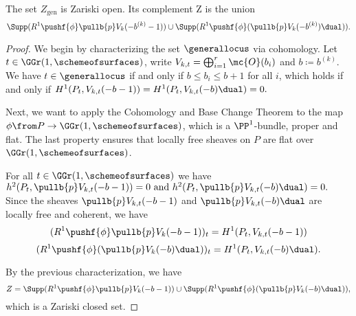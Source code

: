 \begin{proposition}
	The set $Z_{\text{gen}}$ is Zariski open. Its complement Z is the union
	\[
		\Supp(R^1 \pushf{\phi}\pullb{p} V_{k}(-b^{(k)}-1)) \cup
		\Supp(R^1 \pushf{\phi}(\pullb{p} V_{k}(-b^{(k)})\dual)).
	\]
\end{proposition}
\begin{proof}
	We begin by characterizing the set $\generallocus$ via cohomology. Let $t\in \GGr(1,\schemeofsurfaces)$, write $V_{k,t}=\bigoplus_{i=1}^r \mc{O}(b_i)$ and $b\coloneqq b^{(k)}$. We have $t\in \generallocus$ if and only if $b\leq b_i \leq b+1$ for all $i$, which holds if and only if
	$
	H^1(P_t, V_{k,t}(-b-1))
	=
	H^1(P_t, V_{k,t}(-b)\dual)
	=0.
	$

	Next, we want to apply the Cohomology and Base Change Theorem \cite[{}28.1.6]{vakil-algebraic-geometry} to the map 
	$\phi \from P \to \GGr(1,\schemeofsurfaces)$, which is a $\PP^1$-bundle, proper and flat. The last property ensures that locally free sheaves on $P$ are flat over $\GGr(1,\schemeofsurfaces)$.

	For all $t\in \GGr(1,\schemeofsurfaces)$ we have
	$
	h^2(P_t, \pullb{p}V_{k,t}(-b-1)) = 0
	\text{ and }
	h^2(P_t,\pullb{p}V_{k,t}(-b)\dual)=0.
	$
	Since the sheaves $\pullb{p}V_{k,t}(-b-1)$ and $\pullb{p}V_{k,t}(-b)\dual$ are locally free and coherent, we have 
	\[(R^1 \pushf{\phi}\pullb{p} V_{k}(-b-1))_t = H^1(P_t,V_{k,t}(-b-1))\]
	\[
	(R^1 \pushf{\phi}(\pullb{p} V_{k}(-b)\dual))_t = H^1(P_t,V_{k,t}(-b)\dual).
	\]

	By the previous characterization, we have
	\[
		Z =
		\Supp(R^1 \pushf{\phi}\pullb{p} V_{k}(-b-1)) \cup
		\Supp(R^1 \pushf{\phi}(\pullb{p} V_{k}(-b)\dual)),
	\]
	which is a Zariski closed set.
\end{proof}
